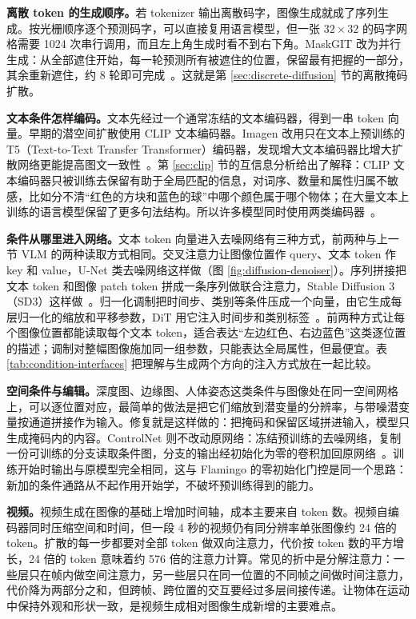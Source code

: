 \textbf{离散 token 的生成顺序。}若 tokenizer 输出离散码字，图像生成就成了序列生成。按光栅顺序逐个预测码字，可以直接复用语言模型，但一张 \(32\times32\) 的码字网格需要 1024 次串行调用，而且左上角生成时看不到右下角。MaskGIT 改为并行生成：从全部遮住开始，每一轮预测所有被遮住的位置，保留最有把握的一部分，其余重新遮住，约 8 轮即可完成~\cite{chang2022maskgit}。这就是第 \ref{sec:discrete-diffusion} 节的离散掩码扩散。

\textbf{文本条件怎样编码。}文本先经过一个通常冻结的文本编码器，得到一串 token 向量。早期的潜空间扩散使用 CLIP 文本编码器。Imagen 改用只在文本上预训练的 T5（Text-to-Text Transfer Transformer）编码器，发现增大文本编码器比增大扩散网络更能提高图文一致性~\cite{saharia2022imagen}。第 \ref{sec:clip} 节的互信息分析给出了解释：CLIP 文本编码器只被训练去保留有助于全局匹配的信息，对词序、数量和属性归属不敏感，比如分不清“红色的方块和蓝色的球”中哪个颜色属于哪个物体；在大量文本上训练的语言模型保留了更多句法结构。所以许多模型同时使用两类编码器~\cite{esser2024sd3}。

\textbf{条件从哪里进入网络。}文本 token 向量进入去噪网络有三种方式，前两种与上一节 VLM 的两种读取方式相同。交叉注意力让图像位置作 query、文本 token 作 key 和 value，U-Net 类去噪网络这样做（图 \ref{fig:diffusion-denoiser}）。序列拼接把文本 token 和图像 patch token 拼成一条序列做联合注意力，Stable Diffusion 3（SD3）这样做~\cite{esser2024sd3}。归一化调制把时间步、类别等条件压成一个向量，由它生成每层归一化的缩放和平移参数，DiT 用它注入时间步和类别标签~\cite{peebles2023dit}。前两种方式让每个图像位置都能读取每个文本 token，适合表达“左边红色、右边蓝色”这类逐位置的描述；调制对整幅图像施加同一组参数，只能表达全局属性，但最便宜。表 \ref{tab:condition-interfaces} 把理解与生成两个方向的注入方式放在一起比较。

\textbf{空间条件与编辑。}深度图、边缘图、人体姿态这类条件与图像处在同一空间网格上，可以逐位置对应，最简单的做法是把它们缩放到潜变量的分辨率，与带噪潜变量按通道拼接作为输入。修复就是这样做的：把掩码和保留区域拼进输入，模型只生成掩码内的内容。ControlNet 则不改动原网络：冻结预训练的去噪网络，复制一份可训练的分支读取条件图，分支的输出经初始化为零的卷积加回原网络~\cite{zhang2023controlnet}。训练开始时输出与原模型完全相同，这与 Flamingo 的零初始化门控是同一个思路：新加的条件通路从不起作用开始学，不破坏预训练得到的能力。

\textbf{视频。}视频生成在图像的基础上增加时间轴，成本主要来自 token 数。视频自编码器同时压缩空间和时间，但一段 4 秒的视频仍有同分辨率单张图像约 24 倍的 token。扩散的每一步都要对全部 token 做双向注意力，代价按 token 数的平方增长，24 倍的 token 意味着约 576 倍的注意力计算。常见的折中是分解注意力：一些层只在帧内做空间注意力，另一些层只在同一位置的不同帧之间做时间注意力，代价降为两部分之和，但跨帧、跨位置的交互要经过多层间接传递。让物体在运动中保持外观和形状一致，是视频生成相对图像生成新增的主要难点。

